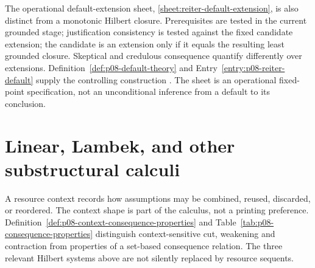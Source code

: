 The operational default-extension sheet,
\ref{sheet:reiter-default-extension}, is also distinct from a monotonic
Hilbert closure.  Prerequisites are tested in the current grounded stage;
justification consistency is tested against the fixed candidate extension;
the candidate is an extension only if it equals the resulting least grounded
closure.  Skeptical and credulous consequence quantify differently over
extensions.  Definition~\ref{def:p08-default-theory} and
Entry~\ref{entry:p08-reiter-default} supply the controlling construction
\cite{Reiter1980}.  The sheet is an operational fixed-point specification,
not an unconditional inference from a default to its conclusion.


\section{Linear, Lambek, and other substructural calculi}
\label{sec:p14-nonclassical-substructural}

A resource context records how assumptions may be combined, reused,
discarded, or reordered.  The context shape is part of the calculus, not a
printing preference.  Definition~\ref{def:p08-context-consequence-properties}
and Table~\ref{tab:p08-consequence-properties} distinguish context-sensitive
cut, weakening and contraction from properties of a set-based consequence
relation.  The three relevant Hilbert systems above are not silently
replaced by resource sequents.

